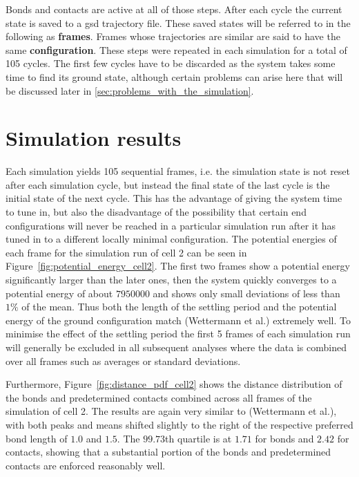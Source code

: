 Bonds and contacts are active at all of those steps. After each cycle the current state is saved to a gsd trajectory file. These saved states will be referred to in the following as \textbf{frames}. Frames whose trajectories are similar are said to have the same \textbf{configuration}. These steps were repeated in each simulation for a total of 105 cycles. The first few cycles have to be discarded as the system takes some time to find its ground state, although certain problems can arise here that will be discussed later in \ref{sec:problems_with_the_simulation}.


\section{Simulation results} %
\label{sec:simulation_results}

Each simulation yields 105 sequential frames, i.e. the simulation state is not reset after each simulation cycle, but instead the final state of the last cycle is the initial state of the next cycle. This has the advantage of giving the system time to tune in, but also the disadvantage of the possibility that certain end configurations will never be reached in a particular simulation run after it has tuned in to a different locally minimal configuration. The potential energies of each frame for the simulation run of cell 2 can be seen in Figure~\ref{fig:potential_energy_cell2}. The first two frames show a potential energy significantly larger than the later ones, then the system quickly converges to a potential energy of about \(\num{7950000}\) and shows only small deviations of less than \(1 \%\) of the mean. Thus both the length of the settling period and the potential energy of the ground configuration match (Wettermann et al.\cite{wettermann_minimal_2020}) extremely well. To minimise the effect of the settling period the first 5 frames of each simulation run will generally be excluded in all subsequent analyses where the data is combined over all frames such as averages or standard deviations.

Furthermore, Figure~\ref{fig:distance_pdf_cell2} shows the distance distribution of the bonds and predetermined contacts combined across all frames of the simulation of cell 2. The results are again very similar to (Wettermann et al.\cite{wettermann_minimal_2020}), with both peaks and means shifted slightly to the right of the respective preferred bond length of \(1.0\) and \(1.5\). The \(99.73\)th quartile is at \(1.71\) for bonds and \(2.42\) for contacts, showing that a substantial portion of the bonds and predetermined contacts are enforced reasonably well.

